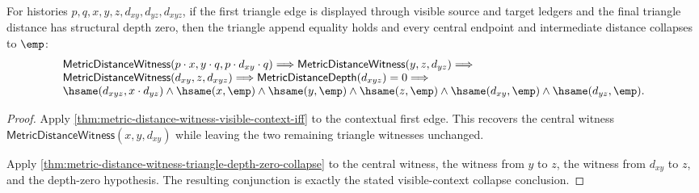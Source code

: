 \begin{theorem}
\label{thm:metric-distance-witness-visible-context-triangle-depth-zero-collapse}
For histories $p,q,x,y,z,d_{xy},d_{yz},d_{xyz}$, if the first triangle edge
is displayed through visible source and target ledgers and the final triangle
distance has structural depth zero, then the triangle append equality holds
and every central endpoint and intermediate distance collapses to $\emp$:
$$
\begin{array}{l}
\mathsf{MetricDistanceWitness}(p\cdot x,y\cdot q,p\cdot d_{xy}\cdot q)
\Longrightarrow
\mathsf{MetricDistanceWitness}(y,z,d_{yz})\Longrightarrow
\\
\mathsf{MetricDistanceWitness}(d_{xy},z,d_{xyz})\Longrightarrow
\mathsf{MetricDistanceDepth}(d_{xyz})=0\Longrightarrow
\\
\hsame(d_{xyz},x\cdot d_{yz})\land
\hsame(x,\emp)\land\hsame(y,\emp)\land\hsame(z,\emp)\land
\hsame(d_{xy},\emp)\land\hsame(d_{yz},\emp).
\end{array}
$$
\end{theorem}
\begin{proof}
Apply \autoref{thm:metric-distance-witness-visible-context-iff} to the
contextual first edge. This recovers the central witness
$\mathsf{MetricDistanceWitness}(x,y,d_{xy})$ while leaving the two remaining
triangle witnesses unchanged.

Apply
\autoref{thm:metric-distance-witness-triangle-depth-zero-collapse} to the
central witness, the witness from $y$ to $z$, the witness from $d_{xy}$ to $z$,
and the depth-zero hypothesis. The resulting conjunction is exactly the stated
visible-context collapse conclusion.
\end{proof}

